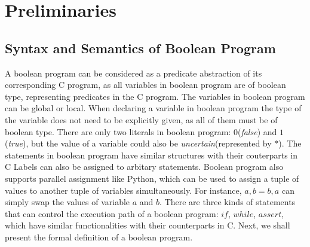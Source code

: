 
\section{Preliminaries}
\label{section:Preliminaries}
\subsection{Syntax and Semantics of Boolean Program}
\label{section:SyntaxAndSemanticsOfBooleanProgram}

A boolean program can be considered as a predicate abstraction of its corresponding C program, as all variables in boolean program are of boolean type, representing predicates in the C program. The variables in boolean program can be global or local.
When declaring a variable in boolean program the type of the variable does not need to be explicitly given, as all of them must be of boolean type.
There are only two literals in boolean program: $0$(\textit{false}) and $1$(\textit{true}), but the value of a variable could also be \textit{uncertain}(represented by $*$).
The statements in boolean program have similar structures with their couterparts in C Labels can also be assigned to arbitary statements.
Boolean program also supports parallel assignment like Python, which can be used to assign a tuple of values to another tuple of variables simultaneously.
For instance, $a, b = b, a$ can simply swap the values of variable $a$ and $b$.
There are three kinds of statements that can control the execution path of a boolean program: $if$, $while$, $assert$, which have similar functionalities with their counterparts in C.
Next, we shall present the formal definition of a boolean program.

